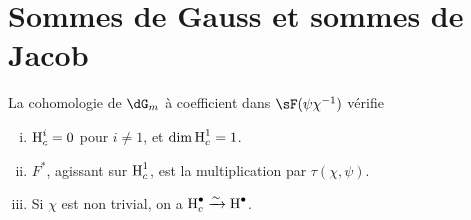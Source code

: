 \section{Sommes de Gauss et sommes de Jacob}\label{VI:4}

\begin{proposition_}\label{VI:4-2}
La cohomologie de $\dG_m$ \`a coefficient dans $\sF(\psi\chi^{-1})$ v\'erifie 
\begin{enumerate}[(i)]
  \item $\operatorname{H}_c^i=0$ pour $i\ne 1$, et $\dim \operatorname{H}_c^1=1$. 
  \item $F^\ast$, agissant sur $\operatorname{H}_c^1$, est la multiplication par 
    $\tau(\chi,\psi)$. 
  \item Si $\chi$ est non trivial, on a $\operatorname{H}_c^\bullet \xrightarrow\sim \operatorname{H}^\bullet$. 
\end{enumerate}
\end{proposition_}




